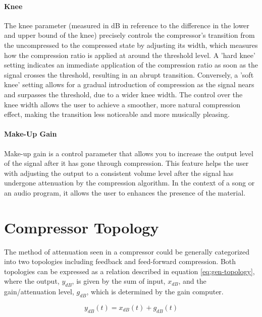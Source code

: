 \documentclass[10pt]{article}
\begin{document}
\begin{multicols*}{2}
            \paragraph{Knee}
                The knee parameter (measured in dB in reference to the difference in the lower and upper bound of the knee) precisely controls the compressor's transition from the uncompressed to the compressed state by adjusting its width, which measures how the compression ratio is applied at around the threshold level. A 'hard knee' setting indicates an immediate application of the compression ratio as soon as the signal crosses the threshold, resulting in an abrupt transition. Conversely, a 'soft knee' setting allows for a gradual introduction of compression as the signal nears and surpasses the threshold, due to a wider knee width. The control over the knee width allows the user to achieve a smoother, more natural compression effect, making the transition less noticeable and more musically pleasing.
            
            \paragraph{Make-Up Gain}
                Make-up gain is a control parameter that allows you to increase the output level of the signal after it has gone through compression. This feature helps the user with adjusting the output to a consistent volume level after the signal has undergone attenuation by the compression algorithm. In the context of a song or an audio program, it allows the user to enhances the presence of the material.

        \section{Compressor Topology} \label{sec:comp-tpgy}
            The method of attenuation seen in a compressor could be generally categorized into two topologies including feedback and feed-forward compression. Both topologies can be expressed as a relation described in equation \ref{eq:gen-topology}, where the output, $y_{dB}$, is given by the sum of input, $x_{dB}$, and the gain/attenuation level, $g_{dB}$, which is determined by the gain computer. 

                \begin{equation} \label{eq:gen-topology}
                    y_{dB}(t)=x_{dB}(t)+g_{dB}(t)
                \end{equation}
            

\end{multicols*}
\end{document}
